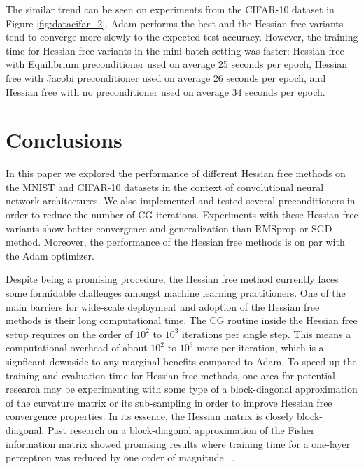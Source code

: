 \documentclass[10pt,twocolumn,letterpaper]{article}
\begin{document}
The similar trend can be seen on experiments from the CIFAR-10 dataset in Figure \ref{fig:datacifar_2}. Adam performs the best and the Hessian-free variants tend to converge more slowly to the expected test accuracy. However, the training time for Hessian free variants in the mini-batch setting was faster: Hessian free with Equilibrium preconditioner used on average 25 seconds per epoch, Hessian free with Jacobi preconditioner used on average 26 seconds per epoch, and Hessian free with no preconditioner used on average 34 seconds per epoch.


\section{Conclusions}

In this paper we explored the performance of different Hessian free methods on the MNIST and CIFAR-10 datasets in the context of convolutional neural network architectures. We also implemented and tested several preconditioners in order to reduce the number of CG iterations. Experiments with these Hessian free variants show better convergence and generalization than RMSprop or SGD method. Moreover, the performance of the Hessian free methods is on par with the Adam optimizer. 

Despite being a promising procedure, the Hessian free method currently faces some formidable challenges amongst machine learning practitioners. One of the main barriers for wide-scale deployment and adoption of the Hessian free methods is their long computational time. The CG routine inside the Hessian free setup requires on the order of $10^2$ to $10^3$ iterations per single step. This means a computational overhead of about $10^2$ to $10^3$ more per iteration, which is a signficant downside to any marginal benefits compared to Adam. To speed up the training and evaluation time for Hessian free methods, one area for potential research may be experimenting with some type of a block-diagonal approximation of the curvature matrix or its sub-sampling in order to improve Hessian free convergence properties. In its essence, the Hessian matrix is closely block-diagonal. Past research on a block-diagonal approximation of the Fisher information matrix showed promising results where training time for a one-layer perceptron was reduced by one order of magnitude ~\cite{LeRoux08}.
\end{document}
